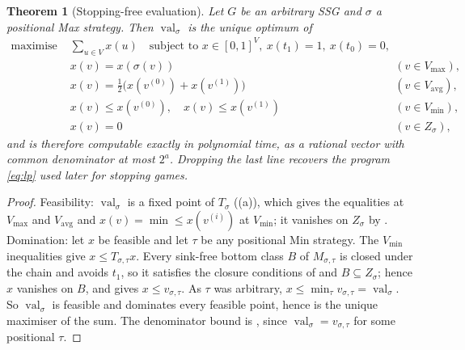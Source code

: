 \documentclass[11pt]{article}
\theoremstyle{plain}
\newtheorem{theorem}{Theorem}[section]
\theoremstyle{definition}
\DeclareMathOperator{\val}{val}
\newcommand{\Vmax}{V_{\max}}
\newcommand{\Vmin}{V_{\min}}
\newcommand{\Vavg}{V_{\mathrm{avg}}}
\begin{document}
\begin{theorem}[Stopping-free evaluation]\label{thm:eval-stopfree}
Let $G$ be an arbitrary SSG and $\sigma$ a positional Max strategy. Then
$\val_\sigma$ is the unique optimum of
\[
\begin{aligned}
  \text{maximise } &\textstyle\sum_{u\in V} x(u)\quad\text{subject to }
     x\in[0,1]^V,\ x(t_1)=1,\ x(t_0)=0,\\
  &x(v)=x(\sigma(v)) && (v\in\Vmax),\\
  &x(v)=\tfrac12\bigl(x(v^{(0)})+x(v^{(1)})\bigr) && (v\in\Vavg),\\
  &x(v)\le x(v^{(0)}),\quad x(v)\le x(v^{(1)}) && (v\in\Vmin),\\
  &x(v)=0 && (v\in Z_\sigma),
\end{aligned}
\]
and is therefore computable exactly in polynomial time, as a rational
vector with common denominator at most $2^{a}$. Dropping the last line
recovers the program \eqref{eq:lp} used later for stopping games.
\end{theorem}

\begin{proof}
Feasibility: $\val_\sigma$ is a fixed point of $T_\sigma$
((a)), which gives the equalities at $\Vmax$ and
$\Vavg$ and $x(v)=\min\le x(v^{(i)})$ at $\Vmin$; it vanishes on
$Z_\sigma$ by . Domination: let $x$ be feasible and let
$\tau$ be any positional Min strategy. The $\Vmin$ inequalities give
$x\le T_{\sigma,\tau}x$. Every sink-free bottom class $B$ of
$M_{\sigma,\tau}$ is closed under the chain and avoids $t_1$, so it
satisfies the closure conditions of  and $B\subseteq
Z_\sigma$; hence $x$ vanishes on $B$, and 
gives $x\le v_{\sigma,\tau}$. As $\tau$ was arbitrary,
$x\le\min_\tau v_{\sigma,\tau}=\val_\sigma$. So $\val_\sigma$ is feasible
and dominates every feasible point, hence is the unique maximiser of the
sum. The denominator bound is , since
$\val_\sigma=v_{\sigma,\tau}$ for some positional $\tau$.
\end{proof}
\end{document}
